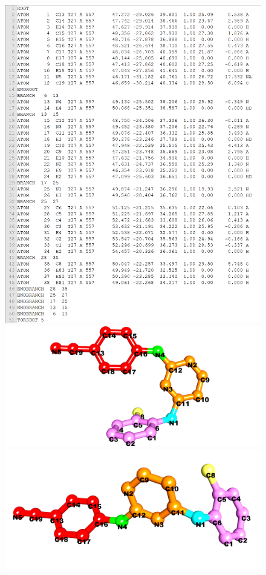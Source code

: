 \begin{figure}
\includegraphics[width=1.36\textwidth,natwidth=1899,natheight=2350]{../usrt/T27DockedPDBQT.png}
\endminipage
\\
\centering
\includegraphics[width=1.36\textwidth,natwidth=1904,natheight=894]{../usrt/T27Crystal.png}
\endminipage
{}
\centering
\includegraphics[width=1.36\textwidth,natwidth=1904,natheight=894]{../usrt/T27Docked.png}

\end{figure}
